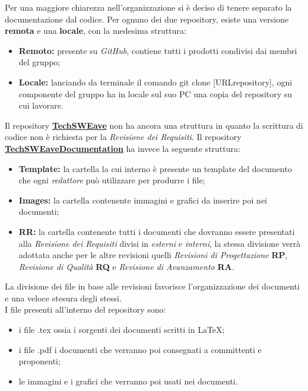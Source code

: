 Per una maggiore chiarezza nell'organizzazione si è deciso di tenere separato la documentazione dal codice.
Per ognuno dei due repository, esiste una versione \textbf{remota} e una \textbf{locale}, con la medesima struttura:
\begin{itemize}
    \item \textbf{Remoto:} presente su \textit{GitHub}, contiene tutti i prodotti condivisi dai membri del gruppo;
    \item \textbf{Locale:} lanciando da terminale il comando {\selectfont git clone [URLrepository]}, ogni componente del gruppo ha in locale sul suo PC una copia del repository su cui lavorare.
\end{itemize}
Il repository \textbf{\href{https://github.com/techsweave/TechSWEave.git}{TechSWEave}} non ha ancora una struttura in quanto la scrittura di codice non è richiesta per la \textit{Revisione dei Requisiti}.
Il repository  \textbf{\href{https://github.com/techsweave/TechSWEaveDocumentation.git}{TechSWEaveDocumentation}} ha invece la seguente struttura:
\begin{itemize}
    \item \textbf{Template:} la cartella la cui interno è presente un template del documento che ogni \textit{redattore} può utilizzare per produrre i file;
    \item \textbf{Images:} la cartella contenente immagini e grafici da inserire poi nei documenti;
    \item \textbf{RR:} la cartella contenente tutti i documenti che dovranno essere presentati alla \textit{Revisione dei Requisiti} divisi in \textit{esterni} e \textit{interni}, la stessa divisione verrà adottata anche per le altre revisioni quelli \textit{Revisioni di Progettazione} \textbf{RP}, \textit{Revisione di Qualità} \textbf{RQ} e \textit{Revisione di Avanzamento} \textbf{RA}.
\end{itemize}
La divisione dei file in base alle revisioni favorisce l'organizzazione dei documenti e una veloce stesura degli stessi.\\
I file presenti all'interno del repository sono:
\begin{itemize}
    \item i file {\selectfont .tex} ossia i sorgenti dei documenti scritti in \LaTeX;
    \item i file {\selectfont .pdf} i documenti che verranno poi consegnati a committenti e proponenti;
    \item le immagini e i grafici che verranno poi usati nei documenti.
\end{itemize}
